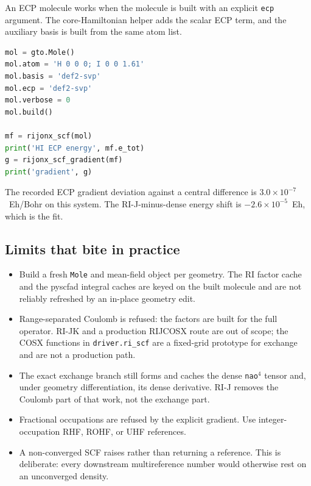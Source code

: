 An ECP molecule works when the molecule is built with an explicit
\texttt{ecp} argument.  The core-Hamiltonian helper adds the scalar ECP
term, and the auxiliary basis is built from the same atom list.

\begin{lstlisting}[language=Python]
mol = gto.Mole()
mol.atom = 'H 0 0 0; I 0 0 1.61'
mol.basis = 'def2-svp'
mol.ecp = 'def2-svp'
mol.verbose = 0
mol.build()

mf = rijonx_scf(mol)
print('HI ECP energy', mf.e_tot)
g = rijonx_scf_gradient(mf)
print('gradient', g)
\end{lstlisting}

The recorded ECP gradient deviation against a central difference is
$3.0\times10^{-7}$~Eh/Bohr on this system.  The RI-J-minus-dense energy
shift is $-2.6\times10^{-5}$~Eh, which is the fit.

\subsection{Limits that bite in practice}

\begin{itemize}
\item Build a fresh \texttt{Mole} and mean-field object per geometry.
  The RI factor cache and the pyscfad integral caches are keyed on the
  built molecule and are not reliably refreshed by an in-place geometry
  edit.
\item Range-separated Coulomb is refused: the factors are built for the
  full operator.  RI-JK and a production RIJCOSX route are out of
  scope; the COSX functions in \texttt{driver.ri\_scf} are a fixed-grid
  prototype for exchange and are not a production path.
\item The exact exchange branch still forms and caches the dense
  \texttt{nao}$^{4}$ tensor and, under geometry differentiation, its
  dense derivative.  RI-J removes the Coulomb part of that work, not
  the exchange part.
\item Fractional occupations are refused by the explicit gradient.  Use
  integer-occupation RHF, ROHF, or UHF references.
\item A non-converged SCF raises rather than returning a reference.
  This is deliberate: every downstream multireference number would
  otherwise rest on an unconverged density.
\end{itemize}
